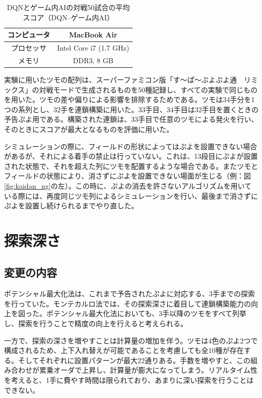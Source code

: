\documentclass[12pt]{jreport}
\begin{document}
\begin{table}[tb]
\begin{center}
\caption{DQNとゲーム内AIの対戦50試合の平均スコア（DQN--ゲーム内AI）} \label{tab:spec}
\begin{tabular}{|c|c|} \hline
コンピュータ & MacBook Air\\ \hline
プロセッサ & Intel Core i7 (1.7 GHz)\\ \hline
メモリ & DDR3, 8 GB\\ \hline
\end{tabular}
\end{center}
\end{table}

実験に用いたツモの配列は、スーパーファミコン版「す～ぱ～ぷよぷよ通　リミックス」の対戦モードで生成されるものを50種記録し、すべての実験で同じものを用いた。ツモの差や偏りによる影響を排除するためである。ツモは34手分を1つの系列とし、32手を連鎖構築に用いた。33手目、34手目は32手目を置くときの予告ぷよ用である。構築された連鎖は、33手目で任意のツモによる発火を行い、そのときにスコアが最大となるものを評価に用いた。

シミュレーションの際に、フィールドの形状によってはぷよを設置できない場合があるが、それによる着手の禁止は行っていない。これは、13段目にぷよが設置された状態で、それを超えた列にツモを配置するような場合である。またツモとフィールドの状態により、消さずにぷよを設置できない場面が生じる（例：図\ref{fig:kaidan_ng}の左）。この時に、ぷよの消去を許さないアルゴリズムを用いている際には、再度同じツモ列によるシミュレーションを行い、最後まで消さずにぷよを設置し続けられるまでやり直した。

\section{探索深さ}
\subsection{変更の内容}
ポテンシャル最大化法は、これまで予告されたぷよに対応する、3手までの探索を行っていた。モンテカルロ法\cite{puyo_monte}では、その探索深さに着目して連鎖構築能力の向上を図った。ポテンシャル最大化法においても、3手以降のツモをすべて列挙し、探索を行うことで精度の向上を行えると考えられる。

一方で、探索の深さを増やすことは計算量の増加を伴う。ツモは4色のぷよ2つで構成されるため、上下入れ替えが可能であることを考慮しても全10種が存在する。そしてそれぞれに設置パターンが最大22通りある。手数を増やすと、この組み合わせが累乗オーダで上昇し、計算量が膨大になってしまう。リアルタイム性を考えると、1手に費やす時間は限られており、あまりに深い探索を行うことはできない。
\end{document}
